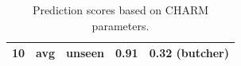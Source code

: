 \begin{table}[]
\begin{adjustbox}{width=0.8\textwidth}
\begin{tabular}{ccc|cl}
10                                                            & avg                                                             & \textbf{unseen}                                                & 0.91                                                                & 0.32 (butcher) \\                      \bottomrule                                  
\end{tabular}
\end{adjustbox}
    \caption{Prediction scores based on CHARM parameters.}
    \label{param_change}
    \vspace{-0.5cm}
\end{table}